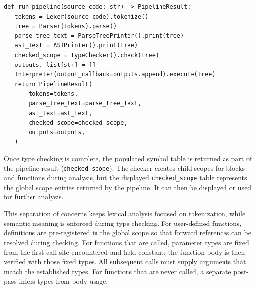\begin{lstlisting}
def run_pipeline(source_code: str) -> PipelineResult:
   tokens = Lexer(source_code).tokenize()
   tree = Parser(tokens).parse()
   parse_tree_text = ParseTreePrinter().print(tree)
   ast_text = ASTPrinter().print(tree)
   checked_scope = TypeChecker().check(tree)
   outputs: list[str] = []
   Interpreter(output_callback=outputs.append).execute(tree)
   return PipelineResult(
       tokens=tokens,
       parse_tree_text=parse_tree_text,
       ast_text=ast_text,
       checked_scope=checked_scope,
       outputs=outputs,
   )
\end{lstlisting}

Once type checking is complete, the populated symbol table is returned as part
of the pipeline result (\texttt{checked\_scope}). The checker creates child
scopes for blocks and functions during analysis, but the displayed
\texttt{checked\_scope} table represents the global scope entries returned by
the pipeline. It can then be displayed or used for further analysis.

This separation of concerns keeps lexical analysis focused on tokenization,
while semantic meaning is enforced during type checking. For user-defined
functions, definitions are pre-registered in the global scope so that forward
references can be resolved during checking. For functions that are called,
parameter types are fixed from the first call site encountered and held
constant; the function body is then verified with those fixed types. All
subsequent calls must supply arguments that match the established types. For
functions that are never called, a separate post-pass infers types from body
usage.
